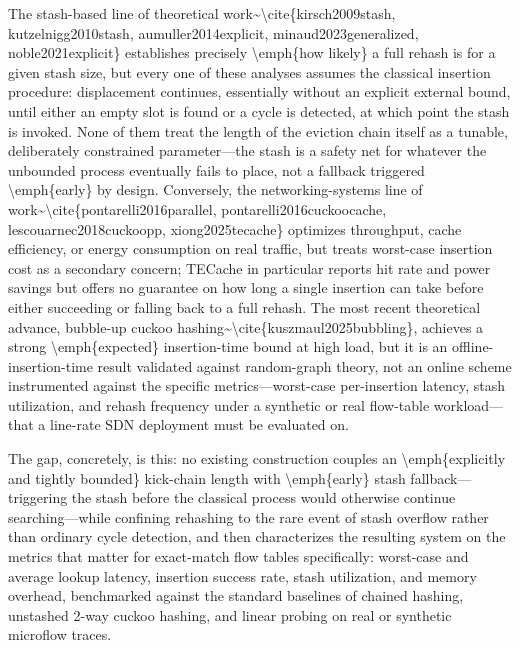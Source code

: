 \documentclass[conference]{IEEEtran}
\begin{document}
The stash-based line of theoretical work\~{}\textbackslash{}cite\{kirsch2009stash, kutzelnigg2010stash, aumuller2014explicit, minaud2023generalized, noble2021explicit\} establishes precisely \textbackslash{}emph\{how likely\} a full rehash is for a given stash size, but every one of these analyses assumes the classical insertion procedure: displacement continues, essentially without an explicit external bound, until either an empty slot is found or a cycle is detected, at which point the stash is invoked. None of them treat the length of the eviction chain itself as a tunable, deliberately constrained parameter---the stash is a safety net for whatever the unbounded process eventually fails to place, not a fallback triggered \textbackslash{}emph\{early\} by design. Conversely, the networking-systems line of work\~{}\textbackslash{}cite\{pontarelli2016parallel, pontarelli2016cuckoocache, lescouarnec2018cuckoopp, xiong2025tecache\} optimizes throughput, cache efficiency, or energy consumption on real traffic, but treats worst-case insertion cost as a secondary concern; TECache in particular reports hit rate and power savings but offers no guarantee on how long a single insertion can take before either succeeding or falling back to a full rehash. The most recent theoretical advance, bubble-up cuckoo hashing\~{}\textbackslash{}cite\{kuszmaul2025bubbling\}, achieves a strong \textbackslash{}emph\{expected\} insertion-time bound at high load, but it is an offline-insertion-time result validated against random-graph theory, not an online scheme instrumented against the specific metrics---worst-case per-insertion latency, stash utilization, and rehash frequency under a synthetic or real flow-table workload---that a line-rate SDN deployment must be evaluated on.

The gap, concretely, is this: no existing construction couples an \textbackslash{}emph\{explicitly and tightly bounded\} kick-chain length with \textbackslash{}emph\{early\} stash fallback---triggering the stash before the classical process would otherwise continue searching---while confining rehashing to the rare event of stash overflow rather than ordinary cycle detection, and then characterizes the resulting system on the metrics that matter for exact-match flow tables specifically: worst-case and average lookup latency, insertion success rate, stash utilization, and memory overhead, benchmarked against the standard baselines of chained hashing, unstashed 2-way cuckoo hashing, and linear probing on real or synthetic microflow traces.
\end{document}
